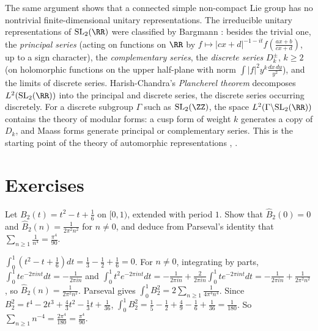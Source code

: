 \begin{remark}\label{harmonic-analysis:remark-sl2}
The same argument shows that a connected simple non-compact Lie group has no nontrivial finite-dimensional unitary representations. The irreducible unitary representations of $\mathrm{SL}_2(\RR)$ were classified by
Bargmann \cite{bargmann-1947}: besides the trivial one, the \emph{principal series} (acting on functions on $\RR$ by $f \mapsto |cx + d|^{-1-it}f(\frac{ax + b}{cx + d})$, up to a sign character), the \emph{complementary series}, the
\emph{discrete series} $D_k^\pm$, $k \geq 2$ (on holomorphic functions on the upper half-plane with norm $\int|f|^2y^{k}\frac{dx\,dy}{y^2}$), and the limits of discrete series. Harish-Chandra's \emph{Plancherel theorem}
decomposes $L^2(\mathrm{SL}_2(\RR))$ into the principal and discrete series, the discrete series occurring discretely. For a discrete subgroup $\Gamma$ such as $\mathrm{SL}_2(\ZZ)$, the space $L^2(\Gamma\backslash\mathrm{SL}_2(\RR))$
contains the theory of modular forms: a cusp form of weight $k$ generates a copy of $D_k$, and Maass forms generate principal or complementary series. This is the starting point of the theory of automorphic
representations \cite{lang-sl2}, \cite{knapp-semisimple}.
\end{remark}

\section{Exercises}\label{harmonic-analysis:section-exercises}

\begin{exercise}\label{harmonic-analysis:exercise-zeta-four}
Let $B_2(t) = t^2 - t + \frac16$ on $[0, 1)$, extended with period $1$. Show that $\hat B_2(0) = 0$ and $\hat B_2(n) = \frac{1}{2\pi^2n^2}$ for $n \neq 0$, and deduce from Parseval's identity that $\sum_{n \geq 1}\frac{1}{n^4} = \frac{\pi^4}{90}$.
\end{exercise}

\begin{solution}
$\int_0^1(t^2 - t + \frac16)dt = \frac13 - \frac12 + \frac16 = 0$. For $n \neq 0$, integrating by parts, $\int_0^1te^{-2\pi int}dt = -\frac{1}{2\pi in}$ and $\int_0^1t^2e^{-2\pi int}dt = -\frac{1}{2\pi in} + \frac{2}{2\pi in}\int_0^1te^{-2\pi int}dt = -\frac{1}{2\pi in} + \frac{1}{2\pi^2n^2}$,
so $\hat B_2(n) = \frac{1}{2\pi^2n^2}$. Parseval gives $\int_0^1B_2^2 = 2\sum_{n \geq 1}\frac{1}{4\pi^4n^4}$. Since $B_2^2 = t^4 - 2t^3 + \frac43t^2 - \frac13t + \frac1{36}$,
$\int_0^1B_2^2 = \frac15 - \frac12 + \frac49 - \frac16 + \frac1{36} = \frac{1}{180}$. So $\sum_{n \geq 1}n^{-4} = \frac{2\pi^4}{180} = \frac{\pi^4}{90}$.
\end{solution}

